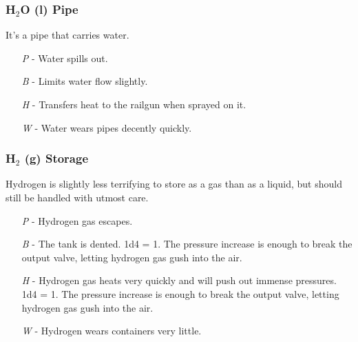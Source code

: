 \documentclass[a4paper]{article}
\begin{document}
\vspace{-0.5cm} \hspace{-18pt} \subsubsection{H$_2$O (l) Pipe} \label{life_h2o_pipe} \vspace{-0.2cm}
It's a pipe that carries water.
\begin{enumerate}
\item [\textit{P}] - Water spills out.
\item [\textit{B}] - Limits water flow slightly.
\item [\textit{H}] - Transfers heat to the railgun when sprayed on it.
\item [\textit{W}] - Water wears pipes decently quickly.
\end{enumerate}

\vspace{-0.5cm} \hspace{-18pt} \subsubsection{H$_2$ (g) Storage} \label{life_h2_storage} \vspace{-0.2cm}
Hydrogen is slightly less terrifying to store as a gas than as a liquid, but should still be handled with utmost care. 
\begin{enumerate}
\item [\textit{P}] - Hydrogen gas escapes.
\item [\textit{B}] - The tank is dented. \newline \hspace*{3pt} 1d4 = 1. The pressure increase is enough to break the output valve, letting hydrogen gas gush into the air.
\item [\textit{H}] - Hydrogen gas heats very quickly and will push out immense pressures. \newline \hspace*{3pt} 1d4 = 1. The pressure increase is enough to break the output valve, letting hydrogen gas gush into the air.
\item [\textit{W}] - Hydrogen wears containers very little.
\end{enumerate}
\end{document}
